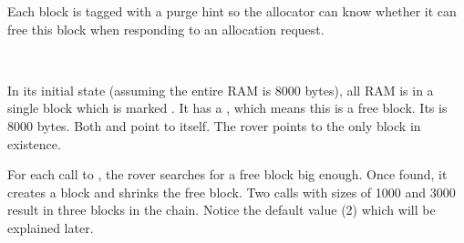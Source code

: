 Each block is tagged with a purge hint so the allocator can know whether it can free this block when responding to an allocation request.\\
\par
{}\\
\par
In its initial state (assuming the entire RAM is 8000 bytes), all RAM is in a single block which is marked . It has a  , which means this is a free block. Its  is 8000 bytes. Both  and  point to itself. The rover points to the only block in existence.\\
\par
{}
\par
For each call to , the rover searches for a free block big enough. Once found, it creates a block and shrinks the free block. Two calls with sizes of 1000 and 3000 result in three blocks in the chain. Notice the default  value (2) which will be explained later.\\
\par
{}

